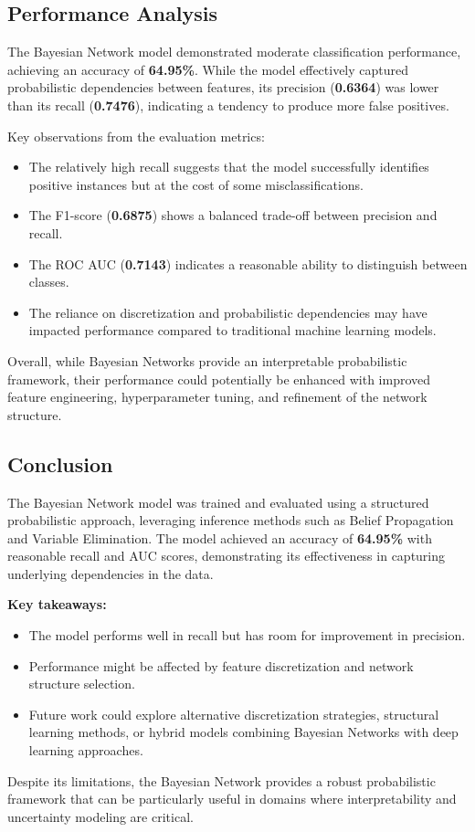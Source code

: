 \subsection{Performance Analysis}

The Bayesian Network model demonstrated moderate classification performance, achieving an accuracy of \textbf{64.95\%}. While the model effectively captured probabilistic dependencies between features, its precision (\textbf{0.6364}) was lower than its recall (\textbf{0.7476}), indicating a tendency to produce more false positives.

Key observations from the evaluation metrics:
\begin{itemize}
    \item The relatively high recall suggests that the model successfully identifies positive instances but at the cost of some misclassifications.
    \item The F1-score (\textbf{0.6875}) shows a balanced trade-off between precision and recall.
    \item The ROC AUC (\textbf{0.7143}) indicates a reasonable ability to distinguish between classes.
    \item The reliance on discretization and probabilistic dependencies may have impacted performance compared to traditional machine learning models.
\end{itemize}

Overall, while Bayesian Networks provide an interpretable probabilistic framework, their performance could potentially be enhanced with improved feature engineering, hyperparameter tuning, and refinement of the network structure.

\subsection{Conclusion}

The Bayesian Network model was trained and evaluated using a structured probabilistic approach, leveraging inference methods such as Belief Propagation and Variable Elimination. The model achieved an accuracy of \textbf{64.95\%} with reasonable recall and AUC scores, demonstrating its effectiveness in capturing underlying dependencies in the data.

\textbf{Key takeaways:}
\begin{itemize}
    \item The model performs well in recall but has room for improvement in precision.
    \item Performance might be affected by feature discretization and network structure selection.
    \item Future work could explore alternative discretization strategies, structural learning methods, or hybrid models combining Bayesian Networks with deep learning approaches.
\end{itemize}

Despite its limitations, the Bayesian Network provides a robust probabilistic framework that can be particularly useful in domains where interpretability and uncertainty modeling are critical.

